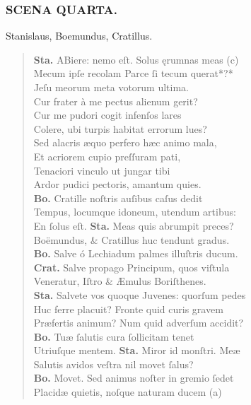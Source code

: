 \documentclass[a4paper,12pt]{article}
\begin{document}
\subsubsection{SCENA QUARTA.}
\label{sec:orgc18046d}

Stanislaus, Boemundus, Cratillus.
\begin{verse}
\textbf{Sta.} ABiere: nemo eſt. Solus ęrumnas meas (c)\footnotemark\\[0pt]
Mecum ipſe recolam Parce ſi tecum querat*?*\\[0pt]
Jeſu meorum meta votorum ultima.\\[0pt]
Cur frater à me pectus alienum gerit?\\[0pt]
Cur me pudori cogit infenſos lares\\[0pt]
Colere, ubi turpis habitat errorum lues?\\[0pt]
Sed alacris æquo perfero hæc animo mala,\\[0pt]
Et acriorem cupio preſſuram pati,\\[0pt]
Tenaciori vinculo ut jungar tibi\\[0pt]
Ardor pudici pectoris, amantum quies.\\[0pt]
\textbf{Bo.} Cratille noſtris auſibus caſus dedit\\[0pt]
Tempus, locumque idoneum, utendum artibus:\\[0pt]
En ſolus eſt. \textbf{Sta.} Meas quis abrumpit preces?\\[0pt]
Boëmundus, \& Cratillus huc tendunt gradus.\\[0pt]
\textbf{Bo.} Salve ó Lechiadum palmes illuſtris ducum.\\[0pt]
\textbf{Crat.} Salve propago Principum, quos viſtula\\[0pt]
Veneratur, Iſtro \& Æmulus Boriſthenes.\\[0pt]
\textbf{Sta.} Salvete vos quoque Juvenes: quorſum pedes\\[0pt]
Huc ferre placuit? Fronte quid curis gravem\\[0pt]
Præfertis animum? Num quid adverſum accidit?\\[0pt]
\textbf{Bo.} Tuæ ſalutis cura ſollicitam tenet\\[0pt]
Utriuſque mentem. \textbf{Sta.} Miror id monſtri. Meæ\\[0pt]
Salutis avidos veſtra nil movet ſalus?\\[0pt]
\textbf{Bo.} Movet. Sed animus noſter in gremio ſedet\\[0pt]
Placidæ quietis, noſque naturam ducem (a)\footnotemark\\[0pt]

\end{verse}
\end{document}
